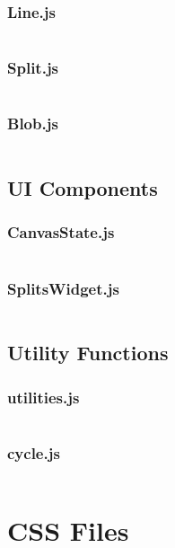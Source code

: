 \documentclass{article}
\begin{document}
\subsubsection{Line.js}
\inputminted{javascript}{Fraction_Bars_files/Line.js}

\subsubsection{Split.js}
\inputminted{javascript}{Fraction_Bars_files/Split.js}

\subsubsection{Blob.js}
\inputminted{javascript}{Fraction_Bars_files/Blob.js}

\subsection{UI Components}
\subsubsection{CanvasState.js}
\inputminted{javascript}{Fraction_Bars_files/CanvasState.js}

\subsubsection{SplitsWidget.js}
\inputminted{javascript}{Fraction_Bars_files/SplitsWidget.js}

\subsection{Utility Functions}
\subsubsection{utilities.js}
\inputminted{javascript}{Fraction_Bars_files/utilities.js}

\subsubsection{cycle.js}
\inputminted{javascript}{Fraction_Bars_files/cycle.js}

\section{CSS Files}
\end{document}
